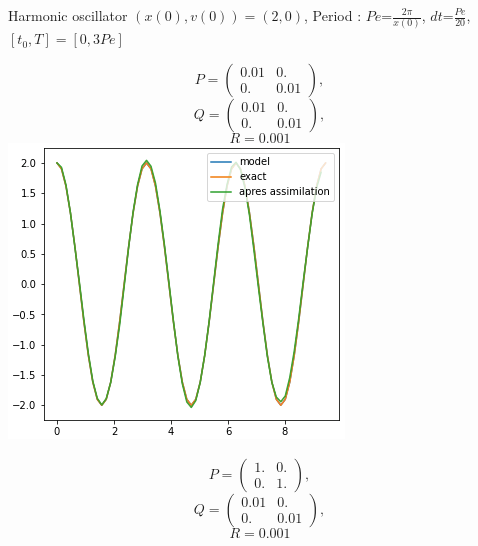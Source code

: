 \begin{frame}{Harmonic oscillator}
	\small
	$(x(0),v(0))=(2,0)$, \quad Period : \; $Pe$=$\frac{2\pi}{x(0)}$, \quad $dt$=$\frac{Pe}{20}$, \quad $[t_0,T]=[0,3Pe]$
	\begin{minipage}{.32\linewidth}
		\centering
		$$P=\begin{pmatrix}
			0.01 & 0. \\ 
			0. & 0.01 
		\end{pmatrix} ,$$
		$$Q=\begin{pmatrix}
			0.01 & 0. \\
			0. & 0.01 
		\end{pmatrix} ,$$
		$$R=0.001$$
		\includegraphics[width=\linewidth]{"images/enkf/oscillator1_b.png"}
	\end{minipage} \;
	\begin{minipage}{.32\linewidth}
		\centering
		$$P=\begin{pmatrix}
			1. & 0. \\
			0. & 1. 
		\end{pmatrix} ,$$
		$$Q=\begin{pmatrix}
			0.01 & 0. \\
			0. & 0.01 
		\end{pmatrix} ,$$
		$$R=0.001$$

\end{minipage}
\end{frame}

